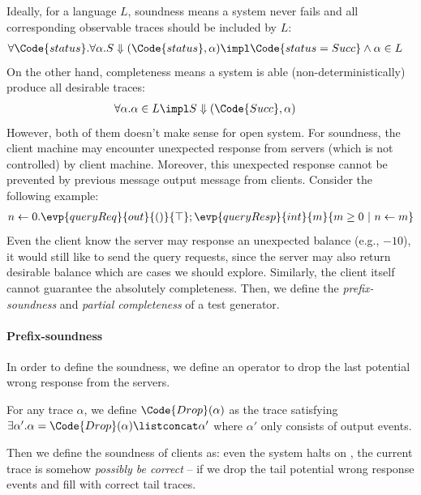 Ideally, for a language $L$, soundness means a system never fails and all corresponding observable traces should be included by $L$:
\begin{align*}
    &\forall \Code{status}. \forall \alpha. S \Downarrow (\Code{status}, \alpha) \impl \Code{status = Succ} \land \alpha \in L
\end{align*}\noindent
On the other hand, completeness means a system is able (non-deterministically) produce all desirable traces:
\begin{align*}
    &\forall \alpha. \alpha \in L \impl S \Downarrow (\Code{Succ}, \alpha)
\end{align*}\noindent
However, both of them doesn't make sense for open system. For soundness, the client machine may encounter unexpected response from servers (which is not controlled) by client machine. Moreover, this unexpected response cannot be prevented by previous message output message from clients. Consider the following example:
\begin{align*}
    n \leftarrow 0.\evp{queryReq}{out}{()}{\top};\evp{queryResp}{int}{m}{m \geq 0 ~|~ n 
    \leftarrow m}
\end{align*}\noindent
Even the client know the server may response an unexpected balance (e.g., $\minus 10$), it would still like to send the query requests, since the server may also return desirable balance which are cases we should explore. Similarly, the client itself cannot guarantee the absolutely completeness. Then, we define the \emph{prefix-soundness} and \emph{partial completeness} of a test generator.

\paragraph{Prefix-soundness} In order to define the soundness, we define an operator to drop the last potential wrong response from the servers.

\begin{definition} For any trace $\alpha$, we define $\Code{Drop}(\alpha)$ as the trace satisfying $\exists \alpha'. \alpha = \Code{Drop}(\alpha) \listconcat \alpha'$ where $\alpha'$ only consists of output events.
\end{definition}

Then we define the soundness of clients as: even the system halts on , the current trace is somehow \emph{possibly be correct} -- if we drop the tail potential wrong response events and fill with correct tail traces.

